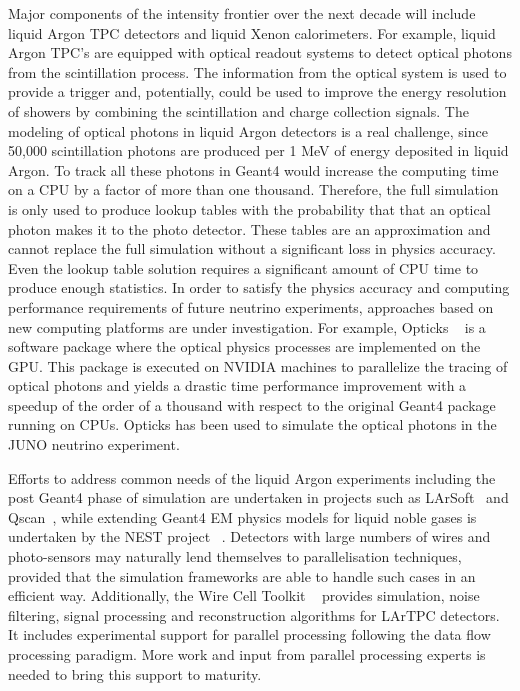 \documentclass[12pt,a4paper]{article}
\begin{document}
{Major components of the intensity frontier over the next decade will
include liquid Argon TPC detectors and liquid Xenon calorimeters.
For example, liquid Argon TPC's are equipped with optical readout systems 
to detect optical photons from the scintillation process. The information 
from the optical system is used to  provide a trigger and, potentially, 
could be used to improve the energy resolution of showers by combining the 
scintillation and charge collection signals. The modeling of optical photons 
in liquid Argon detectors is a real challenge, since 50,000 scintillation 
photons are produced per 1 MeV of energy deposited in liquid Argon. To track 
all these photons in Geant4 would increase the computing time on a CPU by a 
factor of  more than one thousand. Therefore, the full simulation is only used 
to produce lookup tables with the probability that that an optical photon makes 
it to the photo detector. These tables are an approximation and cannot replace 
the full simulation without a significant loss in physics accuracy. Even the 
lookup table solution requires a significant amount of CPU time to produce 
enough statistics. In order to satisfy the physics accuracy and computing 
performance requirements of future neutrino experiments, approaches based 
on new computing platforms are under investigation. For example, 
Opticks ~\cite{1742-6596-898-4-042001} 
is a software package where the optical physics processes are implemented on the GPU. 
This package is executed on NVIDIA machines to parallelize the
tracing of optical photons and yields a drastic time performance improvement 
with a speedup of the order of a thousand with respect to the original Geant4 
package running on CPUs. Opticks has been used to simulate the optical photons 
in the JUNO neutrino experiment. 

Efforts to address common needs of the liquid Argon experiments
including the post Geant4 phase of simulation are undertaken in projects
such as LArSoft~\cite{LArSoft} and Qscan~\cite{LArLEM-TPC}, while extending Geant4 EM
physics models for liquid noble gases is undertaken by the NEST project
~\cite{Szydagis:2013sih}. Detectors with large numbers of wires and photo-sensors may
naturally lend themselves to parallelisation techniques, provided that
the simulation frameworks are able to handle such cases in an efficient
way. Additionally, the Wire Cell Toolkit ~\cite{Wire-Cell} provides simulation,
noise filtering, signal processing and reconstruction algorithms for
LArTPC detectors. It includes experimental support for parallel
processing following the data flow processing paradigm. More work and
input from parallel processing experts is needed to bring this support
to maturity.

}
\end{document}
